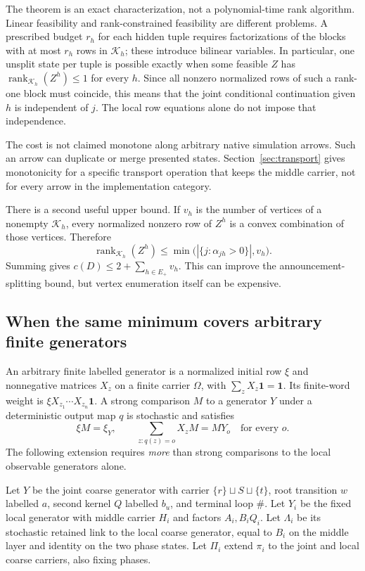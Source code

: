 \documentclass[11pt]{article}
\newcommand{\one}{\mathbf 1}
\newcommand{\Kcal}{\mathcal K}
\theoremstyle{remark}
\begin{document}
The theorem is an exact characterization, not a polynomial-time rank algorithm. Linear feasibility and rank-constrained feasibility are different problems. A prescribed budget $r_h$ for each hidden tuple requires factorizations of the blocks with at most $r_h$ rows in $\Kcal_h$; these introduce bilinear variables. In particular, one unsplit state per tuple is possible exactly when some feasible $Z$ has $\operatorname{rank}_{\Kcal_h}(Z^h)\le1$ for every $h$. Since all nonzero normalized rows of such a rank-one block must coincide, this means that the joint conditional continuation given $h$ is independent of $j$. The local row equations alone do not impose that independence.

The cost is not claimed monotone along arbitrary native simulation arrows. Such an arrow can duplicate or merge presented states. Section~\ref{sec:transport} gives monotonicity for a specific transport operation that keeps the middle carrier, not for every arrow in the implementation category.

There is a second useful upper bound. If $v_h$ is the number of vertices of a nonempty $\Kcal_h$, every normalized nonzero row of $Z^h$ is a convex combination of those vertices. Therefore
\[
 \operatorname{rank}_{\Kcal_h}(Z^h)
 \le\min\bigl(|\{j:\alpha_{jh}>0\}|,v_h\bigr).
\]
Summing gives $c(D)\le2+\sum_{h\in E_+}v_h$. This can improve the announcement-splitting bound, but vertex enumeration itself can be expensive.

\subsection{When the same minimum covers arbitrary finite generators}\label{sec:general-native}

An arbitrary finite labelled generator is a normalized initial row $\xi$ and nonnegative matrices $X_z$ on a finite carrier $\Omega$, with $\sum_zX_z\one=\one$. Its finite-word weight is $\xi X_{z_1}\cdots X_{z_n}\one$. A strong comparison $M$ to a generator $Y$ under a deterministic output map $q$ is stochastic and satisfies
\begin{equation}\label{eq:strong-native}
 \xi M=\xi_Y,\qquad
 \sum_{z:q(z)=o}X_zM=MY_o\quad\text{for every }o.
\end{equation}
The following extension requires \emph{more} than strong comparisons to the local observable generators alone.

Let $Y$ be the joint coarse generator with carrier $\{r\}\sqcup S\sqcup\{t\}$, root transition $w$ labelled $a$, second kernel $Q$ labelled $b_u$, and terminal loop $\#$. Let $Y_i$ be the fixed local generator with middle carrier $H_i$ and factors $A_i,B_iQ_i$. Let $\Lambda_i$ be its stochastic retained link to the local coarse generator, equal to $B_i$ on the middle layer and identity on the two phase states. Let $\Pi_i$ extend $\pi_i$ to the joint and local coarse carriers, also fixing phases.
\end{document}
